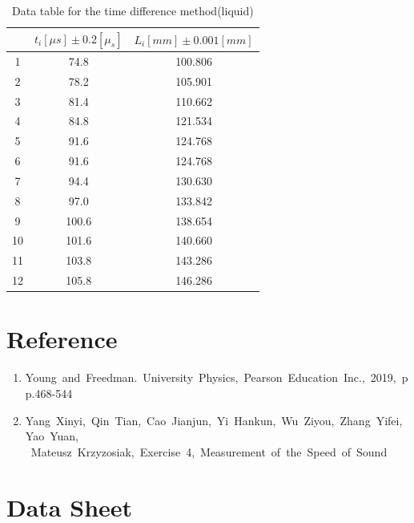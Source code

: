 \documentclass[12pt,a4paper]{article}
\begin{document}
\begin{table}[H]
    \centering
    \begin{tabular}{|c|c|c|}
        \hline
         & $t_i[\mu s]\pm 0.2[\mu_s]$ & $L_i[mm]\pm 0.001[mm]$ \\
        \hline
        1 & 74.8 & 100.806 \\
        \hline
        2 & 78.2 & 105.901 \\
        \hline
        3 & 81.4 & 110.662 \\
        \hline
        4 & 84.8 & 121.534 \\
        \hline
        5 & 91.6 & 124.768 \\
        \hline
        6 & 91.6 & 124.768 \\
        \hline
        7 & 94.4 & 130.630 \\
        \hline
        8 & 97.0 & 133.842 \\
        \hline 
        9 & 100.6 & 138.654 \\
        \hline 
        10 & 101.6 & 140.660 \\
        \hline
        11 & 103.8 & 143.286 \\
        \hline
        12 & 105.8 & 146.286 \\
        \hline
    \end{tabular}
    \caption{Data table for the time difference method(liquid)}
\end{table}

\section{Reference}
\begin{enumerate}[1.]
    \item Young and Freedman. University Physics, Pearson Education Inc., 2019, pp.468-544
    \item Yang Xinyi, Qin Tian, Cao Jianjun, Yi Hankun, Wu Ziyou, Zhang Yifei, Yao Yuan,\\ Mateusz Krzyzosiak, Exercise 4, Measurement of the Speed of Sound
\end{enumerate}

\section{Data Sheet}
\end{document}
